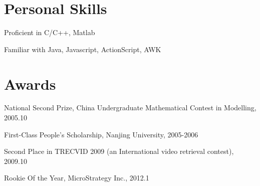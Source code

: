 \documentclass[letterpaper]{article}
\renewenvironment{itemize}{
  \begin{list}{}{
    \setlength{\leftmargin}{1.5em}
    \setlength{\itemsep}{0pt}
  }
}{
  \end{list}
}
\begin{document}
\section*{Personal Skills}
\begin{itemize}
\item Proficient in C/C++, Matlab
\item Familiar with Java, Javascript, ActionScript, AWK
%
%
\end{itemize}

\section*{Awards}
\begin{itemize}
\item National Second Prize, China Undergraduate Mathematical Contest in Modelling, 2005.10
\item First-Class People's Scholarship, Nanjing University, 2005-2006
\item Second Place in TRECVID 2009 (an International video retrieval contest), 2009.10
\item Rookie Of the Year, MicroStrategy Inc., 2012.1
\end{itemize}
\end{document}
